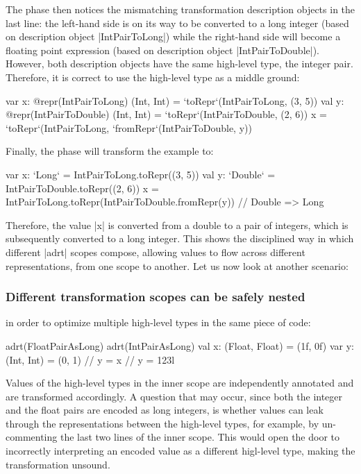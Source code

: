 The \coerce{} phase then notices the mismatching transformation description objects in the last line: the left-hand side is on its way to be converted to a long integer (based on description object |IntPairToLong|) while the right-hand side will become a floating point expression (based on description object |IntPairToDouble|). However, both description objects have the same high-level type, the integer pair. Therefore, it is correct to use the high-level type as a middle ground:

\begin{lstlisting-nobreak}
var x: @repr(IntPairToLong) (Int, Int) = `toRepr`(IntPairToLong, (3, 5))
val y: @repr(IntPairToDouble) (Int, Int) = `toRepr`(IntPairToDouble, (2, 6))
x = `toRepr`(IntPairToLong, `fromRepr`(IntPairToDouble, y))
\end{lstlisting-nobreak}

Finally, the \commit{} phase will transform the example to:

\begin{lstlisting-nobreak}
var x: `Long` = IntPairToLong.toRepr((3, 5))
val y: `Double` = IntPairToDouble.toRepr((2, 6))
x = IntPairToLong.toRepr(IntPairToDouble.fromRepr(y)) // Double => Long
\end{lstlisting-nobreak}

Therefore, the value |x| is converted from a double to a pair of integers, which is subsequently converted to a long integer. This shows the disciplined way in which different |adrt| scopes compose, allowing values to flow across different representations, from one scope to another. Let us now look at another scenario:

\subsubsection{Different transformation scopes can be safely nested} in order to optimize multiple high-level types in the same piece of code:

\begin{lstlisting-nobreak}
adrt(FloatPairAsLong) {
  adrt(IntPairAsLong) {
    val x: (Float, Float) = (1f, 0f)
    var y: (Int, Int) = (0, 1)
    // y = x
    // y = 123l
  }
}
\end{lstlisting-nobreak}

Values of the high-level types in the inner scope are independently annotated and are transformed accordingly. A question that may occur, since both the integer and the float pairs are encoded as long integers, is whether values can leak through the representations between the high-level types, for example, by un-commenting the last two lines of the inner scope. This would open the door to incorrectly interpreting an encoded value as a different higl-level type, making the transformation unsound.

